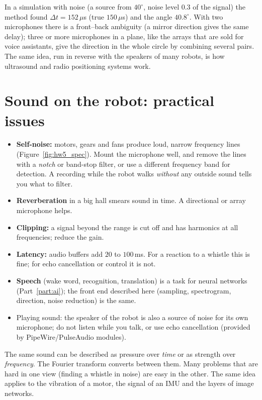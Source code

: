 In a simulation with noise (a source from $40^\circ$, noise level $0.3$ of the signal) the method found $\Delta t=152\,\mu$s (true $150\,\mu$s) and the angle $40.8^\circ$. With two microphones there is a front--back ambiguity (a mirror direction gives the same delay); three or more microphones in a plane, like the arrays that are sold for voice assistants, give the direction in the whole circle by combining several pairs. The same idea, run in reverse with the speakers of many robots, is how ultrasound and radio positioning systems work.

\section*{Sound on the robot: practical issues}
\begin{itemize}[nosep]
  \item \textbf{Self-noise:} motors, gears and fans produce loud, narrow frequency lines (Figure~\ref{fig:hw5_spec}). Mount the microphone well, and remove the lines with a \emph{notch} or band-stop filter, or use a different frequency band for detection. A recording while the robot walks \emph{without} any outside sound tells you what to filter.
  \item \textbf{Reverberation} in a big hall smears sound in time. A directional or array microphone helps.
  \item \textbf{Clipping:} a signal beyond the range is cut off and has harmonics at all frequencies; reduce the gain.
  \item \textbf{Latency:} audio buffers add $20$ to $100$\,ms. For a reaction to a whistle this is fine; for echo cancellation or control it is not.
  \item \textbf{Speech} (wake word, recognition, translation) is a task for neural networks (Part~\ref{part:ai}); the front end described here (sampling, spectrogram, direction, noise reduction) is the same.
  \item Playing sound: the speaker of the robot is also a source of noise for its own microphone; do not listen while you talk, or use echo cancellation (provided by PipeWire/PulseAudio modules).
\end{itemize}

\begin{keyidea}
The same sound can be described as pressure over \emph{time} or as strength over \emph{frequency}. The Fourier transform converts between them. Many problems that are hard in one view (finding a whistle in noise) are easy in the other. The same idea applies to the vibration of a motor, the signal of an IMU and the layers of image networks.
\end{keyidea}

